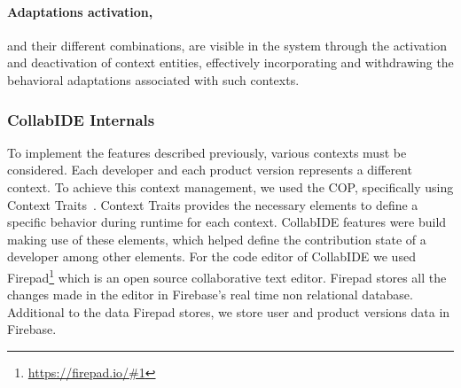 \paragraph{Adaptations activation,} and their different combinations, are visible in the system through the activation and deactivation of context entities, effectively incorporating and withdrawing the behavioral adaptations associated with such contexts.


\subsubsection{CollabIDE Internals}
To implement the features described previously, various contexts must be considered. Each developer 
and each product version represents a different context. To achieve this context management, we used 
the \ac{COP}, specifically using Context Traits~\cite{gonzalez13}. 
Context Traits provides the necessary elements to define a specific behavior during runtime for each 
context. CollabIDE features were build making use of these elements, which helped define the 
contribution state of a developer among other elements.
For the code editor of CollabIDE we used Firepad\footnote{\url{https://firepad.io/\#1}} which is an open 
source collaborative text editor. Firepad stores all the changes made in the editor in Firebase’s real 
time non relational database. Additional to the data Firepad stores, we store user and product versions 
data in Firebase.

\endinput
